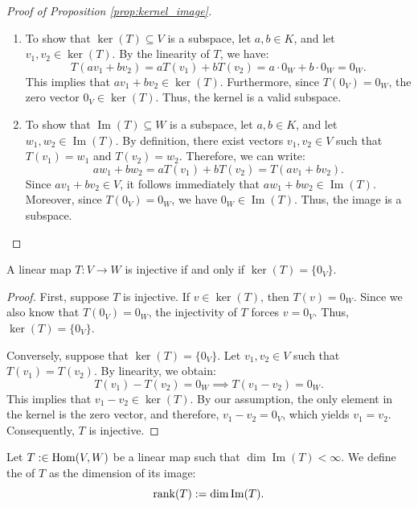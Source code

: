 \begin{proof}[Proof of Proposition \ref{prop:kernel_image}]
\begin{enumerate}
    \item To show that $\ker(T) \subseteq V$ is a subspace, let $a, b \in K$, and let $v_1, v_2 \in \ker(T)$. By the linearity of $T$, we have:
    \[
    T(a v_1 + b v_2) = a T(v_1) + b T(v_2) = a \cdot 0_W + b \cdot 0_W = 0_W.
    \]
    This implies that $a v_1 + b v_2 \in \ker(T)$. Furthermore, since $T(0_V) = 0_W$, the zero vector $0_V \in \ker(T)$. Thus, the kernel is a valid subspace.
    
    \item To show that $\operatorname{Im}(T) \subseteq W$ is a subspace, let $a, b \in K$, and let $w_1, w_2 \in \operatorname{Im}(T)$. By definition, there exist vectors $v_1, v_2 \in V$ such that $T(v_1) = w_1$ and $T(v_2) = w_2$. Therefore, we can write:
    \[
    a w_1 + b w_2 = a T(v_1) + b T(v_2) = T(a v_1 + b v_2).
    \]
    Since $a v_1 + b v_2 \in V$, it follows immediately that $a w_1 + b w_2 \in \operatorname{Im}(T)$. Moreover, since $T(0_V) = 0_W$, we have $0_W \in \operatorname{Im}(T)$. Thus, the image is a subspace.
\end{enumerate}
\end{proof}

\begin{proposition}
\label{prop:injectivity_kernel}
A linear map $T: V \to W$ is injective if and only if $\ker(T) = \{0_V\}$.
\end{proposition}

\begin{proof}
First, suppose $T$ is injective. If $v \in \ker(T)$, then $T(v) = 0_W$. Since we also know that $T(0_V) = 0_W$, the injectivity of $T$ forces $v = 0_V$. Thus, $\ker(T) = \{0_V\}$.

Conversely, suppose that $\ker(T) = \{0_V\}$. Let $v_1, v_2 \in V$ such that $T(v_1) = T(v_2)$. By linearity, we obtain:
\[
T(v_1) - T(v_2) = 0_W \implies T(v_1 - v_2) = 0_W.
\]
This implies that $v_1 - v_2 \in \ker(T)$. By our assumption, the only element in the kernel is the zero vector, and therefore, $v_1 - v_2 = 0_V$, which yields $v_1 = v_2$. Consequently, $T$ is injective.
\end{proof}

\begin{definition}
\label{def:rank_linear_map}
Let $T: \in \operatorname{Hom}(V, W)$ be a linear map such that $\dim \operatorname{Im}(T) < \infty$. We define the  of $T$ as the dimension of its image:
\[
\operatorname{rank}(T) := \dim \operatorname{Im}(T).
\]
\end{definition}


